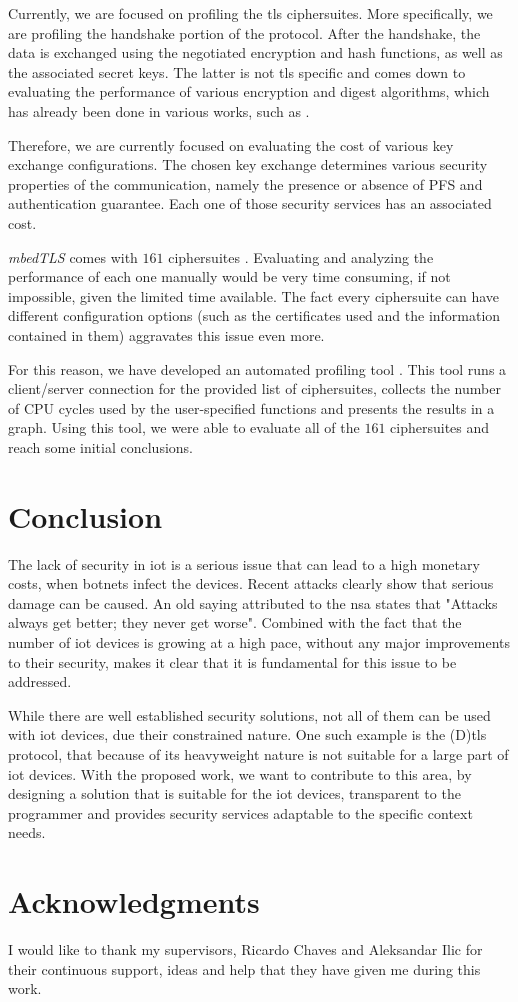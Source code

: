 \documentclass[conference]{IEEEtran}
\begin{document}
Currently, we are focused on profiling the
\gls{tls} ciphersuites. More specifically, we are profiling the
handshake portion of the protocol. After the handshake, the data
is exchanged using the negotiated encryption and hash functions,
as well as the associated secret keys. The latter is not
\gls{tls} specific and comes down to evaluating the performance of
various encryption and digest algorithms, which has already
been done in various works, such as \cite{kansal2014performance}
\cite{rihan2015performance} \cite{patil2016comprehensive} \cite{dahal2013performance}.

Therefore, we are currently focused on evaluating
the cost of various key exchange configurations. The chosen key
exchange determines various security properties of the communication,
namely the presence or absence of PFS and authentication guarantee.
Each one of those security services has an associated cost.

\textit{mbedTLS} comes with $161$ ciphersuites \cite{Supporte13:online}. Evaluating and analyzing the performance of each one manually would be very time consuming, if not impossible,
given the limited time available. The fact every ciphersuite can have
different configuration options (such as the certificates used and
the information contained in them) aggravates this issue even more.

For this reason, we have developed an automated profiling tool \cite{iluxonch55:online}.
This tool runs a client/server connection for the provided list of
ciphersuites, collects the number of CPU cycles used by the user-specified
functions and presents the results in a graph. Using this tool, we were
able to evaluate all of the $161$ ciphersuites and reach some initial
conclusions.


\section{Conclusion}

The lack of security in \gls{iot} is a serious issue that can lead to a high monetary costs,
when botnets infect the devices. Recent
attacks clearly show that serious damage can be caused. An old saying attributed to the
\gls{nsa} states that "Attacks always get better; they never get worse".
Combined with the fact that the number of \gls{iot} devices is growing at a high
pace, without any major improvements to their security, makes it clear
that it is fundamental for this issue to be addressed.

While there are well established security solutions, not all of them can be used
with \gls{iot} devices, due their constrained nature. One such example is
the (D)\gls{tls} protocol, that because of its heavyweight nature is not suitable for a large part of \gls{iot} devices. With the proposed work,
we want to contribute to this area, by designing a solution that is suitable for the \gls{iot} devices, transparent
to the programmer and provides security services adaptable to the specific context needs.


\section*{Acknowledgments}

I would like to thank my supervisors, Ricardo Chaves and Aleksandar Ilic for
their continuous support, ideas and help that they have given me during
this work.



\end{document}
